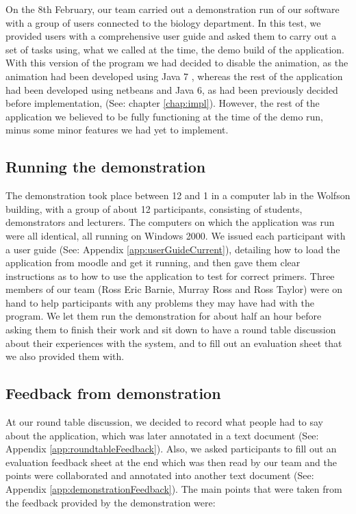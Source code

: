 On the 8th February, our team carried out a demonstration run of our software with a group of users connected to the biology department. In this test, we provided users with a comprehensive user guide and asked them to carry out a set of tasks using, what we called at the time, the demo build of the application. With this version of the program we had decided to disable the animation, as the animation had been developed using Java 7 \cite{Java7SwingAPI}, whereas the rest of the application had been developed using netbeans and Java 6, as had been previously decided before implementation, (See: chapter \ref{chap:impl}). However, the rest of the application we believed to be fully functioning at the time of the demo run, minus some minor features we had yet to implement.

\subsection{Running the demonstration}

The demonstration took place between 12 and 1 in a computer lab in the Wolfson building, with a group of about 12 participants, consisting of students, demonstrators and lecturers. The computers on which the application was run were all identical, all running on Windows 2000. We issued each participant with a user guide (See: Appendix \ref{app:userGuideCurrent}), detailing how to load the application from moodle and get it running, and then gave them clear instructions as to how to use the application to test for correct primers. Three members of our team (Ross Eric Barnie, Murray Ross and Ross Taylor) were on hand to help participants with any problems they may have had with the program. We let them run the demonstration for about half an hour before asking them to finish their work and sit down to have a round table discussion about their experiences with the system, and to fill out an evaluation sheet that we also provided them with.

\subsection{Feedback from demonstration}

At our round table discussion, we decided to record what people had to say about the application, which was later annotated in a text document (See: Appendix \ref{app:roundtableFeedback}). Also, we asked participants to fill out an evaluation feedback sheet at the end which was then read by our team and the points were collaborated and annotated into another text document (See: Appendix \ref{app:demonstrationFeedback}). The main points that were taken from the feedback provided by the demonstration were:

